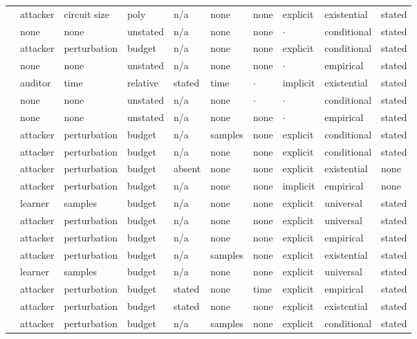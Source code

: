 \begin{landscape}
\begin{longtable}{rlllllllll}
\cite{GJMM20} & attacker & circuit size & poly & n/a & none & none & explicit & existential & stated \\
\cite{MDM19} & none & none & unstated & n/a & none & none & $\cdot$ & conditional & stated \\
\cite{PSV23} & attacker & perturbation & budget & n/a & none & none & explicit & conditional & stated \\
\cite{MZME19} & none & none & unstated & n/a & none & none & $\cdot$ & empirical & stated \\
\cite{BGGKRR26} & auditor & time & relative & stated & time & $\cdot$ & implicit & existential & stated \\
\cite{GCSGWVBHMB25} & none & none & unstated & n/a & none & $\cdot$ & $\cdot$ & conditional & stated \\
\cite{FTHMLD26} & none & none & unstated & n/a & none & none & $\cdot$ & empirical & stated \\
\cite{DMM20} & attacker & perturbation & budget & n/a & samples & none & explicit & conditional & stated \\
\cite{CYDS26} & attacker & perturbation & budget & n/a & none & none & explicit & conditional & stated \\
\cite{ACW18} & attacker & perturbation & budget & absent & none & none & explicit & existential & none \\
\cite{CAPBRTGMK19} & attacker & perturbation & budget & n/a & none & none & implicit & empirical & none \\
\cite{CBM18} & learner & samples & budget & n/a & none & none & explicit & universal & stated \\
\cite{WK18} & attacker & perturbation & budget & n/a & none & none & explicit & universal & stated \\
\cite{SYLZZRB19} & attacker & perturbation & budget & n/a & none & none & explicit & empirical & stated \\
\cite{SSTTM18} & attacker & perturbation & budget & n/a & samples & none & explicit & existential & stated \\
\cite{MHS22} & learner & samples & budget & n/a & none & none & explicit & universal & stated \\
\cite{CASDFCMH21} & attacker & perturbation & budget & stated & none & time & explicit & empirical & stated \\
\cite{TSETM19} & attacker & perturbation & budget & stated & none & none & explicit & existential & stated \\
\cite{HDDH26} & attacker & perturbation & budget & n/a & samples & none & explicit & conditional & stated \\

\end{longtable}
\end{landscape}
